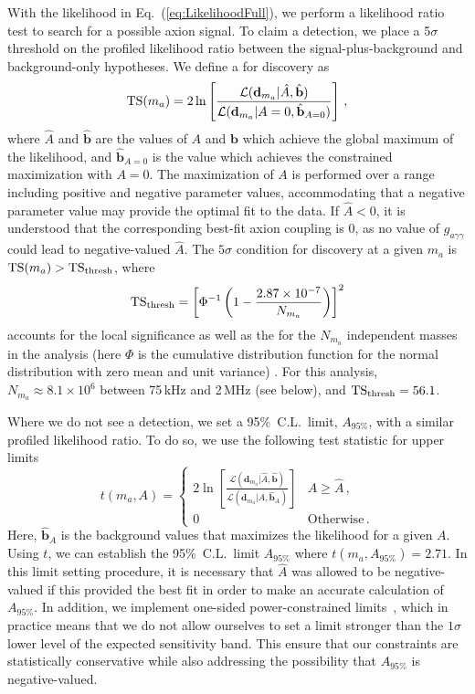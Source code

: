 \documentclass[aps,prd,amsmath,amssymb,reprint,superscriptaddress, nofootinbib,
]{revtex4-1}
\begin{document}
 
With the likelihood in Eq.~(\ref{eq:LikelihoodFull}), we perform a likelihood ratio test to search for a possible axion signal. To claim a detection, we place a 5$\sigma$ threshold on the profiled likelihood ratio between the signal-plus-background and background-only hypotheses. We define a \TS for discovery as
\begin{equation}
\label{eq:TSDef}
{\rm TS}(m_a) = 2\ln\left[ \frac{\mathcal{L}(\mathbf{d}_{m_a}|\hat{A},\hat{\mathbf{b}})}{\mathcal{L}(\mathbf{d}_{m_a}|A = 0, \hat{\mathbf{b}}_{A = 0})}\right]\,,
\end{equation}
where $\hat{A}$ and $\hat{\mathbf{b}}$ are the values of $A$ and $\mathbf{b}$ which achieve the global maximum of the likelihood, and $\hat{\mathbf{b}}_{A = 0}$ is the value which achieves the constrained maximization with $A=0$. The maximization of $A$ is performed over a range including positive and negative parameter values, accommodating that a negative parameter value may provide the optimal fit to the data. If $\hat{A} <0$, it is understood that the corresponding best-fit axion coupling is 0, as no value of $g_{a \gamma \gamma}$ could lead to negative-valued $\hat{A}$. 
The $5\sigma$ condition for discovery at a given $m_a$ is ${\rm TS}(m_a) > {\rm TS}_{\rm thresh}$, where
\begin{equation}
\label{eq:LookElsewhere}
{\rm TS}_{\rm thresh} = \left [ \Phi^{-1}\left(1 - \frac{2.87 \times 10^{-7}}{N_{m_a}}\right) \right]^2
\end{equation}
accounts for the local significance as well as the \LEE for the $N_{m_a}$ independent masses in the analysis (here $\Phi$ is the cumulative distribution function for the normal distribution with zero mean and unit variance) \cite{Foster2018}. For this analysis, $N_{m_a} \approx8.1\times10^6$ between 75\,kHz and 2\,MHz (see below), and ${\rm TS}_{\rm thresh} = 56.1$.

Where we do not see a detection, we set a 95\%~C.L.\ limit, $A_{95\%}$, with a similar profiled likelihood ratio.  To do so, we use the following test statistic for upper limits
\begin{equation}
t(m_a,A) = 
\begin{cases}
2 \ln \left[ \frac{\mathcal{L}(\mathbf{d}_{m_a}|\hat{A},\hat{\mathbf{b}})}{\mathcal{L}(\mathbf{d}_{m_a}|A, \hat{\mathbf{b}}_A)}\right] & A\ge\hat{A}\,, \\ 
0 & \mathrm{Otherwise}\,.
\end{cases}
\end{equation}
Here, $\hat{\mathbf{b}}_A$ is the background values that maximizes the likelihood for a given $A$. Using $t$, we can establish the 95\%~C.L.\ limit $A_{95\%}$ where $t(m_a,A_{95\%}) = 2.71$. In this limit setting procedure, it is necessary that $\hat{A}$ was allowed to be negative-valued if this provided the best fit in order to make an accurate calculation of $A_{95\%}$. In addition, we implement one-sided power-constrained limits~\cite{Cowan:2011an}, which in practice means that we do not allow ourselves to set a limit stronger than the $1\sigma$ lower level of the expected sensitivity band. This ensure that our constraints are statistically conservative while also addressing the possibility that $A_{95\%}$ is negative-valued. 
\end{document}
